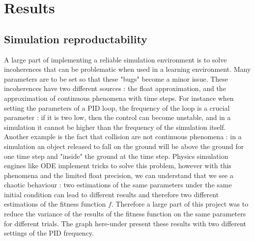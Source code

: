 
\chapter{Results} %

\label{Chapter 5} %



\section{ Simulation reproductability}
    
    A large part of implementing a reliable simulation environment is to solve incoherences that can be problematic when used in a learning environment. Many parameters are to be set so that these "bugs" become a minor issue. These incoherences have two different sources : the float approximation, and the approximation of continuous phenomena with time steps. For instance when setting the parameters of a PID loop, the frequency of the loop is a crucial parameter : if it is two low, then the control can become unstable, and in a simulation it cannot be higher than the frequency of the simulation itself. Another example is the fact that collision are not continuous phenomena : in a simulation an object released to fall on the ground will be above the ground for one time step and "inside" the ground at the time step. Physics simulation engines like ODE implement tricks to solve this problem, however with this phenomena and the limited float precision, we can understand that we see a chaotic behaviour : two estimations of the same parameters under the same initial condition can lead to different results and therefore two different estimations of the fitness function $f$. Therefore a large part of this project was to reduce the variance of the results of the fitness function on the same parameters for different trials. The graph here-under present these results with two different settings of the PID frequency.


